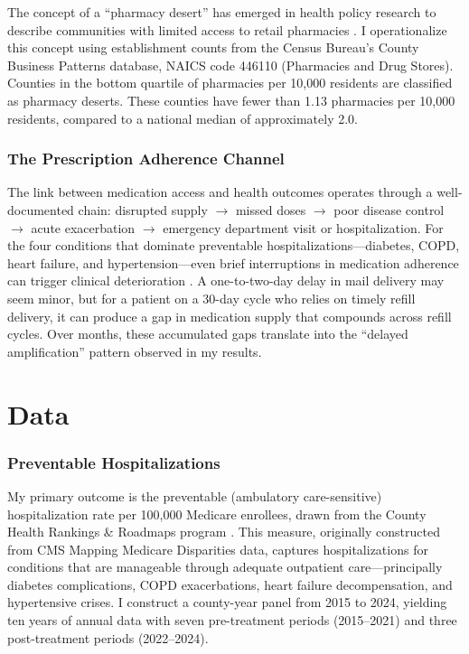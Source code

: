 \documentclass[12pt]{article}
\begin{document}
The concept of a ``pharmacy desert'' has emerged in health policy research to describe communities with limited access to retail pharmacies \citep{qato2014pharmacy, guadamuz2021pharmacy}. I operationalize this concept using establishment counts from the Census Bureau's County Business Patterns database, NAICS code 446110 (Pharmacies and Drug Stores). Counties in the bottom quartile of pharmacies per 10,000 residents are classified as pharmacy deserts. These counties have fewer than 1.13 pharmacies per 10,000 residents, compared to a national median of approximately 2.0.

\subsubsection*{The Prescription Adherence Channel} The link between medication access and health outcomes operates through a well-documented chain: disrupted supply $\rightarrow$ missed doses $\rightarrow$ poor disease control $\rightarrow$ acute exacerbation $\rightarrow$ emergency department visit or hospitalization. For the four conditions that dominate preventable hospitalizations---diabetes, COPD, heart failure, and hypertension---even brief interruptions in medication adherence can trigger clinical deterioration \citep{ho2009importance, osterberg2005adherence}. A one-to-two-day delay in mail delivery may seem minor, but for a patient on a 30-day cycle who relies on timely refill delivery, it can produce a gap in medication supply that compounds across refill cycles. Over months, these accumulated gaps translate into the ``delayed amplification'' pattern observed in my results.

\section{Data}

\subsubsection*{Preventable Hospitalizations} My primary outcome is the preventable (ambulatory care-sensitive) hospitalization rate per 100,000 Medicare enrollees, drawn from the County Health Rankings \& Roadmaps program \citep{chr2024}. This measure, originally constructed from CMS Mapping Medicare Disparities data, captures hospitalizations for conditions that are manageable through adequate outpatient care---principally diabetes complications, COPD exacerbations, heart failure decompensation, and hypertensive crises. I construct a county-year panel from 2015 to 2024, yielding ten years of annual data with seven pre-treatment periods (2015--2021) and three post-treatment periods (2022--2024).
\end{document}
